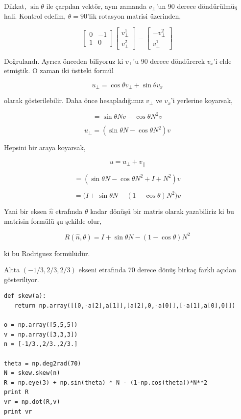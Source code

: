 \documentclass[12pt,fleqn]{article}\usepackage{../../common}
\begin{document}
Dikkat, $\sin \theta$ ile çarpılan vektör, aynı zamanda $v_\perp$'un 90 derece
döndürülmüş hali. Kontrol edelim, $\theta = 90$'lik rotasyon matrisi 
üzerinden,

$$ 
\left[\begin{array}{rrr}
0 & -1 \\ 1 & 0
\end{array}\right]
\left[\begin{array}{rrr}
v_\perp^1 \\
v_\perp^2
\end{array}\right] = 
\left[\begin{array}{rrr}
-v_\perp^2 \\
v_\perp^1
\end{array}\right]
$$

Doğrulandı. Ayrıca önceden biliyoruz ki $v_\perp$'u 90 derece döndürerek $v_x$'i elde
etmiştik. O zaman iki üstteki formül

$$ u_\perp = \cos \theta v_\perp + \sin \theta v_x $$

olarak gösterilebilir. Daha önce hesapladığımız $v_\perp$ ve $v_x$'i
yerlerine koyarsak, 

$$ = \sin \theta Nv - \cos \theta N^2 v $$

$$ u_\perp = (\sin \theta N - \cos \theta N^2) v $$

Hepsini bir araya koyarsak, 

$$ u = u_\perp + v_\parallel $$

$$ = ( \sin \theta N - \cos \theta N^2 + I + N^2)v  $$

$$ = \big( I + \sin \theta N - (1-\cos \theta) N^2 \big) v  $$

Yani bir eksen $\hat{n}$ etrafında $\theta$ kadar dönüşü bir matris olarak
yazabiliriz ki bu matrisin formülü şu şekilde olur, 

$$ R(\hat{n},\theta) =  I + \sin \theta N - (1-\cos \theta) N^2 $$

ki bu Rodriguez formülüdür. 

Altta $(-1/3,2/3,2/3)$ ekseni etrafında 70 derece dönüş birkaç farklı
açıdan gösteriliyor. 

\begin{verbatim}
def skew(a):
   return np.array([[0,-a[2],a[1]],[a[2],0,-a[0]],[-a[1],a[0],0]])

o = np.array([5,5,5])
v = np.array([3,3,3])
n = [-1/3.,2/3.,2/3.]
   
theta = np.deg2rad(70)
N = skew.skew(n)
R = np.eye(3) + np.sin(theta) * N - (1-np.cos(theta))*N**2
print R
vr = np.dot(R,v)
print vr
\end{verbatim}
\end{document}
